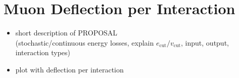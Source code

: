 \section{Muon Deflection per Interaction}\label{sec:defl_per_int}
\begin{itemize}
    \item short description of PROPOSAL \\
        (stochastic/continuous energy losses, explain $e_{\text{cut}}/v_{\text{cut}}$, 
        input, output, 
        interaction types)
    \item plot with deflection per interaction
\end{itemize}